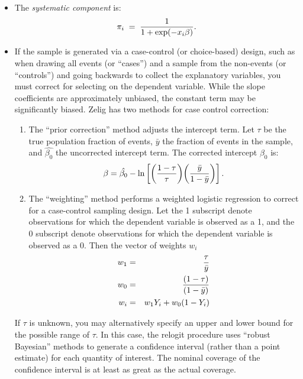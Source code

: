 \documentclass[letterpaper,10pt,english]{sphinxmanual}
\begin{document}
\begin{itemize}
\item {} 
The \emph{systematic component} is:
\begin{gather}
\begin{split}\pi_i \; = \; \frac{1}{1 + \exp(-x_i \beta)}.\end{split}\notag
\end{gather}
\item {} 
If the sample is generated via a case-control (or choice-based)
design, such as when drawing all events (or “cases”) and a sample
from the non-events (or “controls”) and going backwards to collect
the explanatory variables, you must correct for selecting on the
dependent variable. While the slope coefficients are approximately
unbiased, the constant term may be significantly biased. Zelig has
two methods for case control correction:
\begin{enumerate}
\item {} 
The “prior correction” method adjusts the intercept term. Let
\(\tau\) be the true population fraction of events,
\(\bar{y}\) the fraction of events in the sample, and
\(\hat{\beta_0}\) the uncorrected intercept term. The
corrected intercept \(\beta_0\) is:
\begin{gather}
\begin{split}\beta =  \hat{\beta_0} - \ln \left[ \bigg( \frac{1 - \tau}{\tau}
  \bigg) \bigg( \frac{\bar{y}}{1 - \bar{y}} \bigg) \right].\end{split}\notag
\end{gather}
\item {} 
The “weighting” method performs a weighted logistic regression to
correct for a case-control sampling design. Let the 1 subscript
denote observations for which the dependent variable is observed
as a 1, and the 0 subscript denote observations for which the
dependent variable is observed as a 0. Then the vector of weights
\(w_i\)
\begin{gather}
\begin{split}\begin{aligned}
w_1 &=& \frac{\tau}{\bar{y}} \\
w_0 &=& \frac{(1 - \tau)}{(1 - \bar{y})} \\
w_i &=& w_1 Y_i + w_0 (1 - Y_i)\end{aligned}\end{split}\notag
\end{gather}
\end{enumerate}

If \(\tau\) is unknown, you may alternatively specify an upper
and lower bound for the possible range of \(\tau\). In this case,
the relogit procedure uses “robust Bayesian” methods to generate a
confidence interval (rather than a point estimate) for each quantity
of interest. The nominal coverage of the confidence interval is at
least as great as the actual coverage.


\end{itemize}
\end{document}
